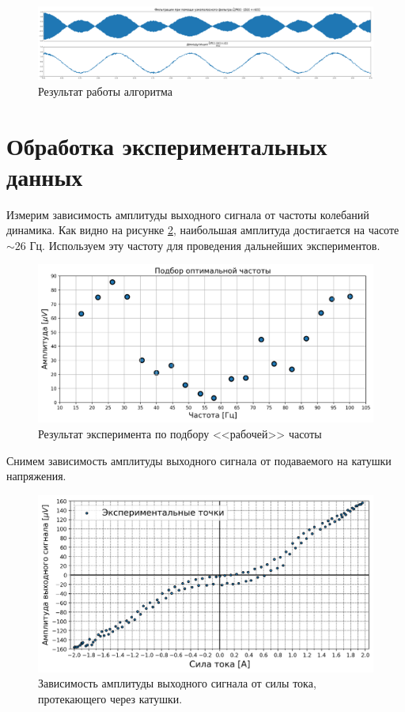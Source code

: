 \documentclass[a4paper, 12pt]{extarticle}
\begin{document}
\begin{figure}[htbp]
    \centering
    \includegraphics[width = \textwidth]{output_signals.png}
    \caption{Результат работы алгоритма}
    \label{fig:result_signal}
\end{figure}


\section*{\textcolor{header}{Обработка экспериментальных данных}}

Измерим зависимость амплитуды выходного сигнала от частоты колебаний динамика. Как видно на рисунке \ref{fig:freq}, наибольшая амплитуда достигается на часоте $\sim 26 \text{ Гц}$. Используем эту частоту для проведения дальнейших экспериментов.
\begin{figure}[htbp]
    \centering
\includegraphics[width = 0.7 \textwidth]{freq.png}
    \caption{Результат эксперимента по подбору <<рабочей>> часоты}
    \label{fig:freq}
\end{figure}


Снимем зависимость амплитуды выходного сигнала от подаваемого на катушки напряжения.
\begin{figure}[htbp]
    \centering
    \includegraphics[width = 0.9 \textwidth]{magnetic_curve.png}
    \caption{Зависимость амплитуды выходного сигнала от силы тока, протекающего через катушки.}
    \label{fig:magnetic}
\end{figure}
\end{document}
